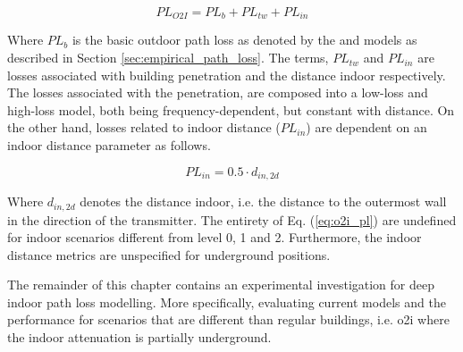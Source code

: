 \begin{equation}\label{eq:o2i_pl}
    PL_{O2I} = PL_{b} + PL_{tw} + PL_{in}
\end{equation}

Where $PL_{b}$ is the basic outdoor path loss as denoted by the  and  models as described in Section \ref{sec:empirical_path_loss}. The terms, $PL_{tw}$ and $PL_{in}$ are losses associated with building penetration and the distance indoor respectively. The losses associated with the penetration, are composed into a low-loss and high-loss model, both being frequency-dependent, but constant with distance.  On the other hand, losses related to indoor distance ($PL_{in}$) are dependent on an indoor distance parameter as follows.

\begin{equation}\label{eq:o2i_pl_in}
    PL_{in} = 0.5 \cdot d_{in,2d}
\end{equation}

Where $d_{in,2d}$ denotes the distance indoor, i.e. the distance to the outermost wall in the direction of the transmitter. The entirety of Eq. (\ref{eq:o2i_pl}) are undefined for indoor scenarios different from level 0, 1 and 2. Furthermore, the indoor distance metrics are unspecified for underground positions. 

The remainder of this chapter contains an experimental investigation for deep indoor path loss modelling. More specifically, evaluating current models and the performance for scenarios that are different than regular buildings, i.e. \gls{o2i} where the indoor attenuation is partially underground. 

